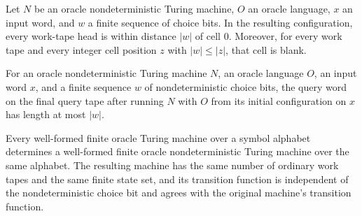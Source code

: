 \begin{theorem}
\label{Turing.OracleNDTM.runWith_workTapes_invariant}
\leanok
{}
Let $N$ be an oracle nondeterministic Turing machine, $O$ an oracle language, $x$ an
input word, and $w$ a finite sequence of choice bits. In the resulting configuration,
every work-tape head is within distance $|w|$ of cell $0$. Moreover, for every work tape
and every integer cell position $z$ with $|w|\le |z|$, that cell is blank.
\end{theorem}

\begin{theorem}
\label{Turing.OracleNDTM.queryString_runWith_length_le}
\leanok
{}
For an oracle nondeterministic Turing machine $N$, an oracle language $O$, an input word
$x$, and a finite sequence $w$ of nondeterministic choice bits, the query word on the
final query tape after running $N$ with $O$ from its initial configuration on $x$ has
length at most $|w|$.
\end{theorem}

\begin{definition}
\label{Turing.FinOracleTM.toFinOracleNDTM}
\leanok
{}
Every well-formed finite oracle Turing machine over a symbol alphabet determines a
well-formed finite oracle nondeterministic Turing machine over the same alphabet. The
resulting machine has the same number of ordinary work tapes and the same finite state
set, and its transition function is independent of the nondeterministic choice bit and
agrees with the original machine's transition function.
\end{definition}
